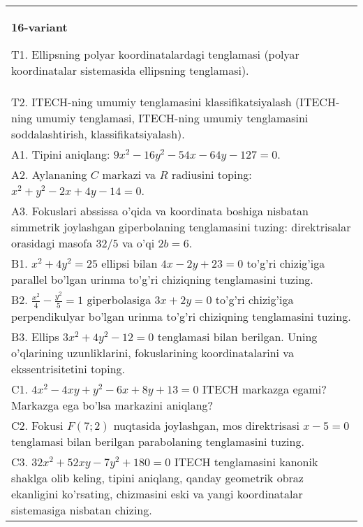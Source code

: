 \documentclass{article}
\begin{document}
\begin{tabular}{m{17cm}}
\textbf{16-variant}
\newline

T1. Ellipsning polyar koordinatalardagi tenglamasi (polyar koordinatalar sistemasida ellipsning tenglamasi).\\

T2. ITECH-ning umumiy tenglamasini klassifikatsiyalash (ITECH-ning umumiy tenglamasi, ITECH-ning umumiy tenglamasini soddalashtirish, klassifikatsiyalash).\\

A1. Tipini aniqlang: $9x^{2}-16y^{2}-54x-64y-127=0$.\\

A2. Aylananing $C$ markazi va $R$ radiusini toping: $x^2+y^2-2x+4y-14=0$.\\

A3. Fokuslari abssissa o'qida va koordinata boshiga nisbatan simmetrik joylashgan giperbolaning tenglamasini tuzing: direktrisalar orasidagi masofa $32/5$ va o'qi $2b=6$.\\

B1. $x^{2} + 4y^{2} = 25$ ellipsi bilan $4x - 2y + 23 = 0$ to'g'ri chizig'iga parallel bo'lgan urinma to'g'ri chiziqning tenglamasini tuzing.  \\

B2. $\frac{x^{2}}{4} - \frac{y^{2}}{5} = 1$ giperbolasiga $3x + 2y = 0$ to'g'ri chizig'iga perpendikulyar bo'lgan urinma to'g'ri chiziqning tenglamasini tuzing.\\

B3. Ellips $3x^{2} + 4y^{2} - 12 = 0$ tenglamasi bilan berilgan. Uning o'qlarining uzunliklarini, fokuslarining koordinatalarini va ekssentrisitetini toping.  \\

C1. $4x^{2} - 4xy + y^{2} - 6x + 8y + 13 = 0$ ITECH markazga egami? Markazga ega bo'lsa markazini aniqlang?  \\

C2. Fokusi $F(7;2)$ nuqtasida joylashgan, mos direktrisasi $x - 5 = 0$ tenglamasi bilan berilgan parabolaning tenglamasini tuzing.  \\

C3. $32x^{2} + 52xy - 7y^{2} + 180 = 0$ ITECH tenglamasini kanonik shaklga olib keling, tipini aniqlang, qanday geometrik obraz ekanligini ko'rsating, chizmasini eski va yangi koordinatalar sistemasiga nisbatan chizing.  \\

\end{tabular}
\vspace{1cm}
\end{document}
